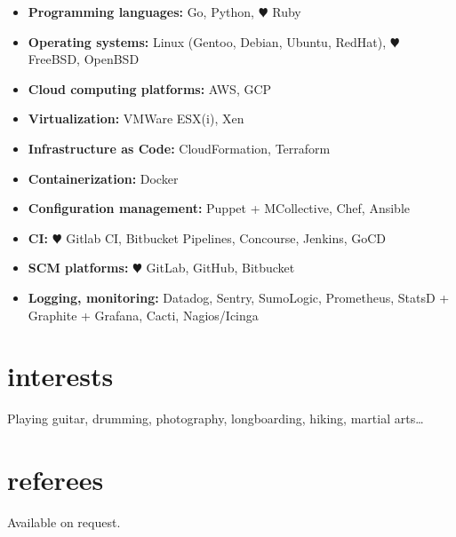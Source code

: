 \documentclass[]{friggeri-cv}
\begin{document}
\begin{itemize}
  \item \textbf{Programming languages:}
        Go, Python, {\color{red} $\varheartsuit$} Ruby
  \item \textbf{Operating systems:}
        Linux (Gentoo, Debian, Ubuntu, RedHat), {\color{red} $\varheartsuit$} FreeBSD, OpenBSD
  \item \textbf{Cloud computing platforms:}
        AWS, GCP
  \item \textbf{Virtualization:}
        VMWare ESX(i), Xen
  \item \textbf{Infrastructure as Code:}
        CloudFormation, Terraform
  \item \textbf{Containerization:}
        Docker
  \item \textbf{Configuration management:}
        Puppet + MCollective, Chef, Ansible
  \item \textbf{CI:}
        {\color{red} $\varheartsuit$} Gitlab CI, Bitbucket Pipelines, Concourse, Jenkins, GoCD
  \item \textbf{SCM platforms:}
        {\color{red} $\varheartsuit$} GitLab, GitHub, Bitbucket
  \item \textbf{Logging, monitoring:}
        Datadog, Sentry, SumoLogic, Prometheus, StatsD + Graphite + Grafana,
        Cacti, Nagios/Icinga
\end{itemize}



\section{interests}

Playing guitar, drumming, photography, longboarding, hiking, martial arts\dots



\section{referees}

Available on request.
\end{document}
